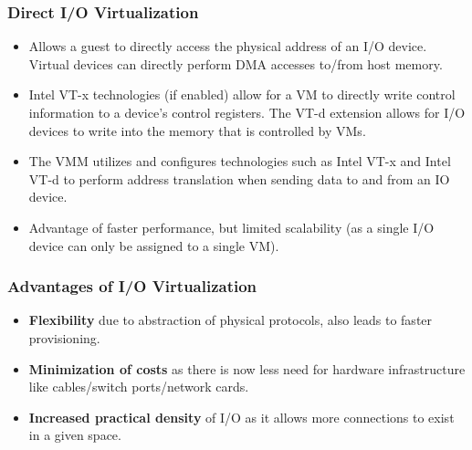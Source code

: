 \documentclass{article}
\begin{document}
\subsubsection{Direct I/O Virtualization}
\begin{itemize}
    \item Allows a guest to directly access the physical address of an I/O device. Virtual devices can directly perform DMA accesses to/from host memory. 
    
    \item Intel VT-x technologies (if enabled) allow for a VM to directly write control information to a device's control registers. The VT-d extension allows for I/O devices to write into the memory that is controlled by VMs.
    
    \item The VMM utilizes and configures technologies such as Intel VT-x and Intel VT-d to perform address translation when sending data to and from an IO device.
    
    \item Advantage of faster performance, but limited scalability (as a single I/O device can only be assigned to a single VM).
\end{itemize}

\subsubsection{Advantages of I/O Virtualization}
\begin{itemize}
    \item \textbf{Flexibility} due to abstraction of physical protocols, also leads to faster provisioning.
    
    \item \textbf{Minimization of costs} as there is now less need for hardware infrastructure like cables/switch ports/network cards. 
    
    \item \textbf{Increased practical density} of I/O as it allows more connections to exist in a given space.
\end{itemize}
\end{document}
